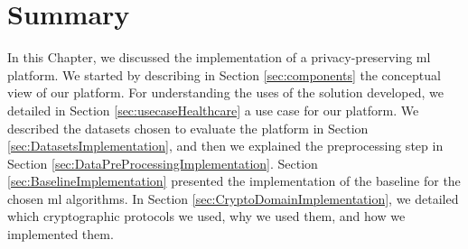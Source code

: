 





  
\section{Summary}
\label{sec:SummaryImplementation}


In this Chapter, we discussed the implementation of a privacy-preserving \ac{ml} platform. 
We started by describing in Section \ref{sec:components} the conceptual view of our platform.
For understanding the uses of the solution developed, we detailed in Section \ref{sec:usecaseHealthcare} a use case for our platform.
We described the datasets chosen to evaluate the platform in Section \ref{sec:DatasetsImplementation}, and then we explained the preprocessing step in Section \ref{sec:DataPreProcessingImplementation}.
Section \ref{sec:BaselineImplementation} presented the implementation of the baseline for the chosen \ac{ml} algorithms.
In Section \ref{sec:CryptoDomainImplementation}, we detailed which cryptographic protocols we used, why we used them, and how we implemented them.



